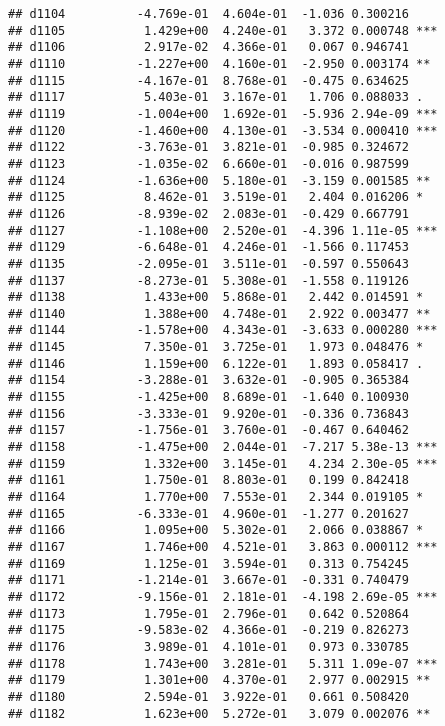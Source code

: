 \documentclass[
]{article}
\begin{document}
\begin{verbatim}
## d1104          -4.769e-01  4.604e-01  -1.036 0.300216    
## d1105           1.429e+00  4.240e-01   3.372 0.000748 ***
## d1106           2.917e-02  4.366e-01   0.067 0.946741    
## d1110          -1.227e+00  4.160e-01  -2.950 0.003174 ** 
## d1115          -4.167e-01  8.768e-01  -0.475 0.634625    
## d1117           5.403e-01  3.167e-01   1.706 0.088033 .  
## d1119          -1.004e+00  1.692e-01  -5.936 2.94e-09 ***
## d1120          -1.460e+00  4.130e-01  -3.534 0.000410 ***
## d1122          -3.763e-01  3.821e-01  -0.985 0.324672    
## d1123          -1.035e-02  6.660e-01  -0.016 0.987599    
## d1124          -1.636e+00  5.180e-01  -3.159 0.001585 ** 
## d1125           8.462e-01  3.519e-01   2.404 0.016206 *  
## d1126          -8.939e-02  2.083e-01  -0.429 0.667791    
## d1127          -1.108e+00  2.520e-01  -4.396 1.11e-05 ***
## d1129          -6.648e-01  4.246e-01  -1.566 0.117453    
## d1135          -2.095e-01  3.511e-01  -0.597 0.550643    
## d1137          -8.273e-01  5.308e-01  -1.558 0.119126    
## d1138           1.433e+00  5.868e-01   2.442 0.014591 *  
## d1140           1.388e+00  4.748e-01   2.922 0.003477 ** 
## d1144          -1.578e+00  4.343e-01  -3.633 0.000280 ***
## d1145           7.350e-01  3.725e-01   1.973 0.048476 *  
## d1146           1.159e+00  6.122e-01   1.893 0.058417 .  
## d1154          -3.288e-01  3.632e-01  -0.905 0.365384    
## d1155          -1.425e+00  8.689e-01  -1.640 0.100930    
## d1156          -3.333e-01  9.920e-01  -0.336 0.736843    
## d1157          -1.756e-01  3.760e-01  -0.467 0.640462    
## d1158          -1.475e+00  2.044e-01  -7.217 5.38e-13 ***
## d1159           1.332e+00  3.145e-01   4.234 2.30e-05 ***
## d1161           1.750e-01  8.803e-01   0.199 0.842418    
## d1164           1.770e+00  7.553e-01   2.344 0.019105 *  
## d1165          -6.333e-01  4.960e-01  -1.277 0.201627    
## d1166           1.095e+00  5.302e-01   2.066 0.038867 *  
## d1167           1.746e+00  4.521e-01   3.863 0.000112 ***
## d1169           1.125e-01  3.594e-01   0.313 0.754245    
## d1171          -1.214e-01  3.667e-01  -0.331 0.740479    
## d1172          -9.156e-01  2.181e-01  -4.198 2.69e-05 ***
## d1173           1.795e-01  2.796e-01   0.642 0.520864    
## d1175          -9.583e-02  4.366e-01  -0.219 0.826273    
## d1176           3.989e-01  4.101e-01   0.973 0.330785    
## d1178           1.743e+00  3.281e-01   5.311 1.09e-07 ***
## d1179           1.301e+00  4.370e-01   2.977 0.002915 ** 
## d1180           2.594e-01  3.922e-01   0.661 0.508420    
## d1182           1.623e+00  5.272e-01   3.079 0.002076 ** 

\end{verbatim}
\end{document}
